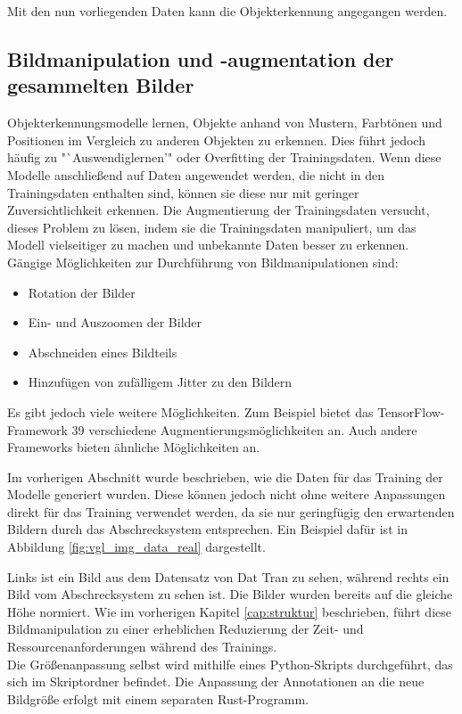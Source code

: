 Mit den nun vorliegenden Daten kann die Objekterkennung angegangen werden.


\subsection{Bildmanipulation und -augmentation der gesammelten Bilder}

Objekterkennungsmodelle lernen, Objekte anhand von Mustern, Farbtönen und Positionen im Vergleich zu anderen Objekten zu erkennen. Dies führt jedoch häufig zu "`Auswendiglernen'" oder Overfitting der Trainingsdaten. Wenn diese Modelle anschließend auf Daten angewendet werden, die nicht in den Trainingsdaten enthalten sind, können sie diese nur mit geringer Zuversichtlichkeit erkennen. Die Augmentierung der Trainingsdaten versucht, dieses Problem zu lösen, indem sie die Trainingsdaten manipuliert, um das Modell vielseitiger zu machen und unbekannte Daten besser zu erkennen.
\\
Gängige Möglichkeiten zur Durchführung von Bildmanipulationen sind:
\begin{itemize}
    \item Rotation der Bilder
    \item Ein- und Auszoomen der Bilder
    \item Abschneiden eines Bildteils
    \item Hinzufügen von zufälligem Jitter zu den Bildern
\end{itemize}
Es gibt jedoch viele weitere Möglichkeiten. Zum Beispiel bietet das TensorFlow-Framework 39 verschiedene Augmentierungsmöglichkeiten an. Auch andere Frameworks bieten ähnliche Möglichkeiten an. \cite{cv_Szeliski,tens_zoo}

Im vorherigen Abschnitt wurde beschrieben, wie die Daten für das Training der Modelle generiert wurden. Diese können jedoch nicht ohne weitere Anpassungen direkt für das Training verwendet werden, da sie nur geringfügig den erwartenden Bildern durch das Abschrecksystem entsprechen. Ein Beispiel dafür ist in Abbildung \ref{fig:vgl_img_data_real} dargestellt.

Links ist ein Bild aus dem Datensatz von Dat Tran zu sehen, während rechts ein Bild vom Abschrecksystem zu sehen ist. Die Bilder wurden bereits auf die gleiche Höhe normiert. Wie im vorherigen Kapitel \ref{cap:struktur} beschrieben, führt diese Bildmanipulation zu einer erheblichen Reduzierung der Zeit- und Ressourcenanforderungen während des Trainings.
\\
Die Größenanpassung selbst wird mithilfe eines Python-Skripts durchgeführt, das sich im Skriptordner befindet. Die Anpassung der Annotationen an die neue Bildgröße erfolgt mit einem separaten Rust-Programm.

